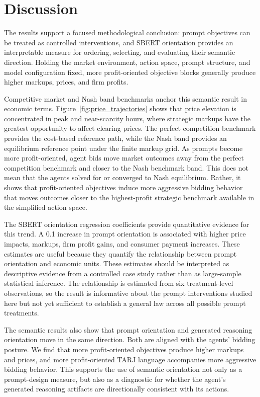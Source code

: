 \section{Discussion}
The results support a focused methodological conclusion: prompt objectives can be treated as controlled interventions, and SBERT orientation provides an interpretable measure for ordering, selecting, and evaluating their semantic direction. Holding the market environment, action space, prompt structure, and model configuration fixed, more profit-oriented objective blocks generally produce higher markups, prices, and firm profits.

Competitive market and Nash band benchmarks anchor this semantic result in economic terms. Figure~\ref{fig:price_trajectories} shows that price elevation is concentrated in peak and near-scarcity hours, where strategic markups have the greatest opportunity to affect clearing prices. The perfect competition benchmark provides the cost-based reference path, while the Nash band provides an equilibrium reference point under the finite markup grid. As prompts become more profit-oriented, agent bids move market outcomes away from the perfect competition benchmark and closer to the Nash benchmark band. This does not mean that the agents solved for or converged to Nash equilibrium. Rather, it shows that profit-oriented objectives induce more aggressive bidding behavior that moves outcomes closer to the highest-profit strategic benchmark available in the simplified action space.

The SBERT orientation regression coefficients provide quantitative evidence for this trend. A 0.1 increase in prompt orientation is associated with higher price impacts, markups, firm profit gains, and consumer payment increases. These estimates are useful because they quantify the relationship between prompt orientation and economic units. These estimates should be interpreted as descriptive evidence from a controlled case study rather than as large-sample statistical inference. The relationship is estimated from six treatment-level observations, so the result is informative about the prompt interventions studied here but not yet sufficient to establish a general law across all possible prompt treatments.

The semantic results also show that prompt orientation and generated reasoning orientation move in the same direction. Both are aligned with the agents' bidding posture. We find that more profit-oriented objectives produce higher markups and prices, and more profit-oriented TARJ language accompanies more aggressive bidding behavior. This supports the use of semantic orientation not only as a prompt-design measure, but also as a diagnostic for whether the agent's generated reasoning artifacts are directionally consistent with its actions.

